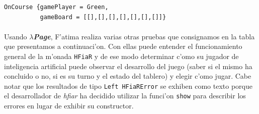 \documentclass[a4paper]{article}
\newcommand{\hpage}{\textbf{\textsl{$\lambda$Page}}}
\begin{document}
\begin{center}\begin{lstlisting}
OnCourse {gamePlayer = Green,
          gameBoard = [[],[],[],[],[],[],[]]}
\end{lstlisting}\end{center}
\newpage
\paragraph{}Usando \hpage, F'atima realiza varias otras pruebas que consignamos en la tabla que presentamos a continuaci'on.  Con ellas puede entender el funcionamiento general de la m'onada \texttt{HFiaR} y de ese modo determinar c'omo su jugador de inteligencia artificial puede observar el desarrollo del juego (saber si el mismo ha concluido o no, si es su turno y el estado del tablero) y elegir c'omo jugar.  Cabe notar que los resultados de tipo \texttt{Left HFiaRError} se exhiben como texto porque el desarrollador de \textsl{hfiar} ha decidido utilizar la funci'on \texttt{show} para describir los errores en lugar de exhibir su constructor.
\end{document}
